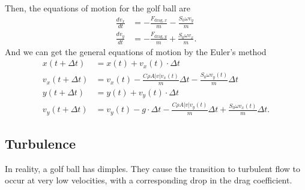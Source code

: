 \documentclass[a4paper]{article}
\begin{document}
	Then, the equations of motion for the golf ball are
	\begin{align}
		\frac{dv_x}{dt} &= - \frac{F_{\mathrm{drag}, x}}{m} - \frac{S_0 \omega v_y}{m} \\
		\frac{dv_y}{dt} &= - \frac{F_{\mathrm{drag}, y}}{m} + \frac{S_0 \omega v_x}{m}. \nonumber
	\end{align}
	And we can get the general equations of motion by the Euler's method
	\begin{align} \label{general}
		x(t + \Delta t) &= x(t) + v_x(t)\cdot\Delta t \\
		v_x (t + \Delta t) &= v_x(t) - \frac{C\rho A |v|v_x(t)  \nonumber}{m}\Delta t - \frac{S_0 \omega v_y(t)}{m}\Delta t \\
		y(t + \Delta t) &= y(t) + v_y(t)\cdot\Delta t \nonumber \\
		v_y(t + \Delta t) &= v_y(t) - g\cdot \Delta t - \frac{C\rho A |v|v_y(t)}{m}\Delta t + \frac{S_0 \omega v_x(t)}{m}\Delta t.\nonumber 			
	\end{align}
	
	\subsection{Turbulence}
	In reality, a golf ball has dimples. They cause the transition to turbulent flow to occur at very low velocities, with a corresponding drop in the drag coefficient. 
	
\end{document}
